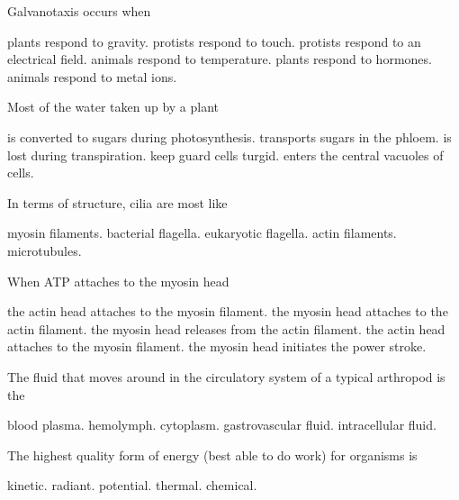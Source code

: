 
\question
Galvanotaxis occurs when 

\begin{choices}
\choice plants respond to gravity.  
\choice protists respond to touch. 
\correctchoice protists respond to an electrical field. 
\choice animals respond to temperature. 
\choice plants respond to hormones. 
\choice animals respond to metal ions. 
\end{choices}

\question
Most of the water taken up by a plant

\begin{choices}
\choice is converted to sugars during photosynthesis. 
\choice transports sugars in the phloem. 
\correctchoice is lost during transpiration. 
\choice keep guard cells turgid. 
\choice enters the central vacuoles of cells.  
\end{choices}

\question
In terms of structure, cilia  are most like 
\begin{choices}
\choice myosin filaments. 
\choice bacterial flagella. 
\correctchoice eukaryotic flagella. 
\choice actin filaments. 
\choice microtubules.  
\end{choices}

\question
When ATP attaches to the myosin head

\begin{choices}
\choice the actin head attaches to the myosin filament. 
\choice the myosin head attaches to the actin filament.  
\correctchoice the myosin head releases from the actin filament. 
\choice the actin head attaches to the myosin filament. 
\choice the myosin head initiates the power stroke. 
\end{choices}

\newpage

\question
The fluid that moves around in the circulatory system of a typical arthropod is the

\begin{choices}
\choice blood plasma. 
\correctchoice hemolymph. 
\choice cytoplasm. 
\choice gastrovascular fluid. 
\choice intracellular fluid. 
\end{choices}

\question
The highest quality form of energy (best able to do work) for organisms is

\begin{choices}
\choice kinetic.
\correctchoice radiant. 
\choice potential.
\choice thermal.
\choice chemical. 
\end{choices}

